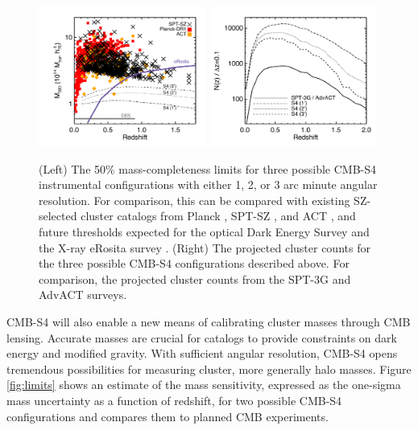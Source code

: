 \begin{figure}[t]
\begin{center}
\includegraphics[width=0.49\textwidth]{DarkEnergy/mass_vs_z_s4.pdf}
\includegraphics[width=0.49\textwidth]{DarkEnergy/dndz_s4.pdf}
\caption{(Left) The 50\% mass-completeness limits for three possible CMB-S4 instrumental configurations with either 1, 2, or 3 arc minute angular resolution.  For comparison, this can be compared with existing SZ-selected cluster catalogs from Planck \cite{Ade:2015mva}, SPT-SZ \cite{Bleem:2014iim}, and ACT \cite{Hasselfield:2013wf}, and future thresholds expected for the optical Dark Energy Survey and the X-ray eRosita survey \cite{Pillepich:2011zz}.  (Right) The projected cluster counts for the three possible CMB-S4 configurations described above.  For comparison, the projected cluster counts from the SPT-3G \cite{Benson:2014qhw} and AdvACT surveys.}
\label{fig:cluster_counts}
\end{center}
\end{figure} 

CMB-S4 will also enable a new means of calibrating cluster masses through CMB lensing.
Accurate masses are crucial for catalogs to provide constraints on dark energy and modified gravity.
With sufficient angular resolution, CMB-S4 opens tremendous possibilities for measuring cluster, more generally halo masses.    
  Figure \ref{fig:limits} shows an estimate of the mass sensitivity, expressed as the one-sigma mass uncertainty as a function of redshift, for two possible CMB-S4 configurations and compares them to planned CMB experiments. 



